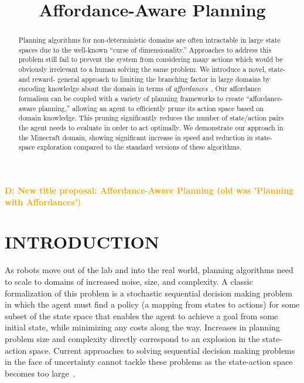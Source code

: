 \documentclass[]{article}
\title{Affordance-Aware Planning}
\newcommand{\stnote}[1]{\textcolor{Blue}{\textbf{ST: #1}}}
\newcommand{\dnote}[1]{\textcolor{Orange}{\textbf{D: #1}}}
\begin{document}
\author{}
\maketitle

\dnote{New title proposal: Affordance-Aware Planning (old was 'Planning with Affordances')}

\begin{abstract}

Planning algorithms for non-deterministic domains are often
intractable in large state spaces due to the well-known
``curse of dimensionality.''  Approaches to address this problem still fail to
prevent the system from considering many actions which would be
obviously irrelevant to a human solving the same problem.  We
introduce a novel, state- and reward- general approach to limiting the
branching factor in large domains by encoding knowledge about the
domain in terms of {\em affordances}~\citep{gibson77}.  Our affordance
formalism can be coupled with a variety of planning frameworks to
create ``affordance-aware planning,'' allowing an agent to efficiently
prune its action space based on domain knowledge.  This pruning
significantly reduces the number of state/action pairs the agent needs
to evaluate in order to act optimally. We demonstrate our approach in
the Minecraft domain, showing significant increase in speed and
reduction in state-space exploration compared to the standard versions
of these algorithms.

\end{abstract}


\section{INTRODUCTION}

As robots move out of the lab and into the real world, planning
algorithms need to scale to domains of increased noise, size, and
complexity.  A classic formalization of this problem is a stochastic
sequential decision making problem in which the agent must find a
policy (a mapping from states to actions) for some subset of the state
space that enables the agent to achieve a goal from some initial
state, while minimizing any costs along the way.
Increases in planning problem size
and complexity directly correspond to an explosion in the state-action
space. Current approaches to solving sequential decision making
problems in the face of uncertainty cannot tackle these problems 
as the state-action space becomes too large~\citep{grounds05}.
\end{document}
